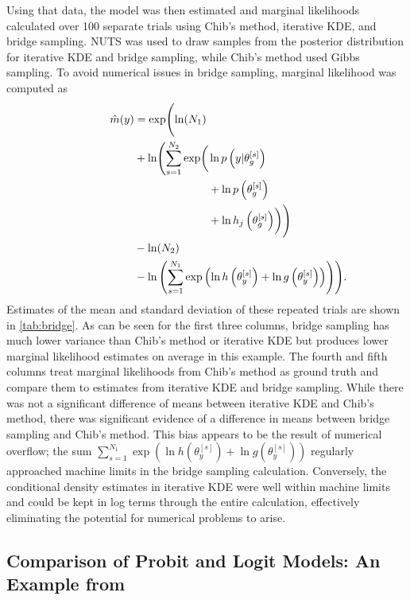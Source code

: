 \documentclass[twocolumn]{article}
\begin{document}
Using that data, the model was then estimated and marginal likelihoods calculated over 100 separate trials using Chib's method, iterative KDE, and bridge sampling. NUTS was used to draw samples from the posterior distribution for iterative KDE and bridge sampling, while Chib's method used Gibbs sampling. To avoid numerical issues in bridge sampling, marginal likelihood was computed as
\begin{align*}
\label{eq:bridgeCalculation}
\hat{m}(y) &= \exp\Biggl(\ln(N_1)\\
&+ \ln\Biggl(\sum_{s=1}^{N_2} \exp\biggl(&&\hspace*{-13.5em}\ln p\left(y|\theta_{g}^{[s]}\right) \\& &&\hspace*{-13.5em}+ \ln p\left(\theta_{g}^{[s]}\right) \\& &&\hspace*{-13.5em} + \ln h_j\left(\theta_{g}^{[s]}\right)\biggr)\Biggr)\\
&- \ln(N_2)\\
&- \ln\left(\sum_{s=1}^{N_1} \exp\left(\ln h\left(\theta_{y}^{[s]}\right) + \ln g\left(\theta_{y}^{[s]}\right)\right)\right)\Biggr).
\end{align*}
Estimates of the mean and standard deviation of these repeated trials are shown in \cref{tab:bridge}. As can be seen for the first three columns, bridge sampling has much lower variance than Chib's method or iterative KDE but produces lower marginal likelihood estimates on average in this example. The fourth and fifth columns treat marginal likelihoods from Chib's method as ground truth and compare them to estimates from iterative KDE and bridge sampling. While there was not a significant difference of means between iterative KDE and Chib's method, there was significant evidence of a difference in means between bridge sampling and Chib's method. This bias appears to be the result of numerical overflow; the sum $\sum_{s=1}^{N_1} \exp\left(\ln h\left(\theta_{y}^{[s]}\right) + \ln g\left(\theta_{y}^{[s]}\right)\right)$ regularly approached machine limits in the bridge sampling calculation. Conversely, the conditional density estimates in iterative KDE were well within machine limits and could be kept in log terms through the entire calculation, effectively eliminating the potential for numerical problems to arise.

\subsection{Comparison of Probit and Logit Models: An Example from \cite{Chib}}
\end{document}
